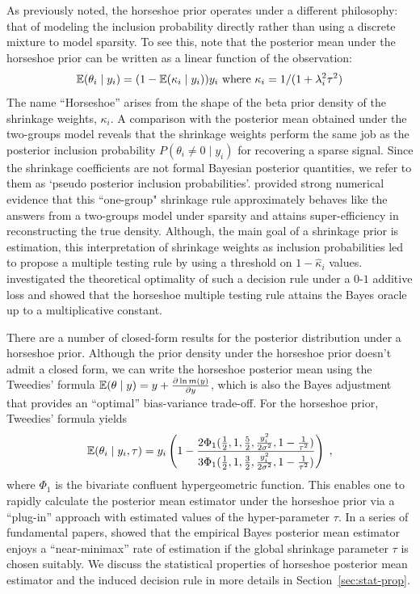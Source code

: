 \documentclass[11pt]{article}
\begin{document}
As previously noted, the horseshoe prior operates under a different philosophy:
that of modeling the inclusion probability directly rather than using a
discrete mixture to model sparsity. To see this, note that the posterior mean
under the horseshoe prior can be written as a linear function of the
observation:
\begin{equation}
\mathbb E(\theta_i \mid y_i) = (1- \mathbb E(\kappa_i \mid y_i))y_i \text{ where } \kappa_i = 1/(1+\lambda_i^2 \tau^2)
\end{equation}
The name ``Horseshoe'' arises from the shape of the beta prior density of the
shrinkage weights, $\kappa_i$. A comparison with the posterior mean obtained
under the two-groups
model reveals that the shrinkage weights perform the same job as the posterior
inclusion probability $P(\theta_i \ne 0 \mid y_i)$ for recovering a sparse
signal. Since the shrinkage coefficients are not formal Bayesian posterior
quantities, we refer to them as `pseudo posterior inclusion probabilities'.
\citet{carvalho2010horseshoe} provided strong numerical evidence that this
``one-group" shrinkage rule approximately behaves like the answers from a
two-groups model under sparsity and attains super-efficiency in reconstructing
the true density. Although, the main goal of a shrinkage prior is estimation,
this interpretation of shrinkage weights as inclusion probabilities led
\citet{carvalho2010horseshoe} to propose a multiple testing rule by using a
threshold on $1-\hat{\kappa}_i$ values. \citet{datta2013asymptotic}
investigated the theoretical optimality of such a decision rule under a $0$-$1$
additive loss and showed that the horseshoe multiple testing rule attains the
Bayes oracle up to a multiplicative constant. 

There are a number of closed-form results for the posterior distribution under a
horseshoe prior. Although the prior density under the horseshoe prior doesn't
admit a closed form, we can write the horseshoe posterior mean using the
Tweedies' formula $\mathbb E(\theta \mid y) = y + \frac{\partial \ln m(y)}{\partial y}$, which is also
the Bayes adjustment that provides an ``optimal'' bias-variance trade-off.
For the horseshoe prior, Tweedies' formula yields
\begin{equation}
  \mathbb E(\theta_i \mid y_i, \tau) = y_i \left( 1 - \frac{2\Phi_1(\frac{1}{2}, 1,
  \frac{5}{2},\frac{y_i^2}{2\sigma^2}, 1-\frac{1}{\tau^2})}{
  3\Phi_1(\frac{1}{2}, 1, \frac{3}{2},\frac{y_i^2}{2\sigma^2}, 1-\frac{1}{\tau^2})} \right)
  \;,
\end{equation}
where $\Phi_1$ is the bivariate confluent hypergeometric function. This
enables one to rapidly calculate the posterior mean estimator under the
horseshoe prior via a ``plug-in'' approach with estimated values of the
hyper-parameter $\tau$. In a series of fundamental papers,
\citet{van2014horseshoe} showed that the empirical Bayes posterior mean
estimator enjoys  a ``near-minimax'' rate of estimation if the global shrinkage
parameter $\tau$ is chosen suitably. We discuss the statistical properties of
horseshoe posterior mean estimator and the induced decision rule in more
details in Section~\ref{sec:stat-prop}. 
\end{document}
